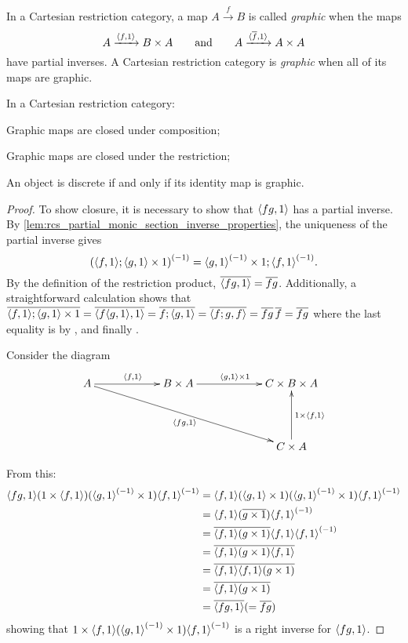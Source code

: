 In a Cartesian restriction category, a map $A\xrightarrow{f}B$ is
called \emph{graphic} when the maps
\[
A\xrightarrow{\langle f,1\rangle}B\times A\qquad \text{and}\qquad
A\xrightarrow{\langle\overline{f},1\rangle}A\times A
\]
have partial inverses.
 A Cartesian restriction category is \emph{graphic} when all of its maps
are graphic.
\begin{lemma}\label{lem:graphic_maps_are_closed_in_a_cartesian_restriction_category}
In a Cartesian restriction category:
\bproofenum
\item Graphic maps are closed under composition;
\item Graphic maps are closed under the restriction;
\item An object is discrete if and only if its identity map is graphic.
\eproofenum
\end{lemma}
\begin{proof}
\bproofenum
\item To show closure, it is necessary to show that $\langle f g,1\rangle$ has a partial inverse.
By \vref{lem:rcs_partial_monic_section_inverse_properties}, the uniqueness of the partial inverse gives
\[{(\langle f,1\rangle ; \langle g,1\rangle\times 1)}^{(-1)} = {\langle g,1\rangle}^{(-1)} \times 1 ; {\langle f,1\rangle}^{(-1)} .\]
 By the definition of the restriction product, $\overline{\langle f g,1\rangle} = \overline{f g}$. Additionally,
a straightforward calculation shows that $\overline{\langle f,1\rangle;\langle g,1\rangle \times 1} = \overline{\langle f\langle g,1\rangle, 1\rangle} = \overline{f ;\langle g,1\rangle}
= \overline{\langle f;g, f\rangle} = \overline{f g}\,\overline{f} = \overline{f g}$ where the last equality is by \rtwo, \rthree and finally \rone.

Consider the diagram
\[
\xymatrix @C+35pt @R+20pt{
A \ar[r]^{\<f,1\>} \ar[drr]_{\<f g,1\>} &
   B \times A  \ar[r]^{\<g,1\> \times 1}
   &  C \times B \times A \\
&&C \times A \ar[u]_{1 \times \<f,1\>}
}
\]

From this:
\begin{align*}
\langle f g,1\rangle  (1\times \langle f,1\rangle) ( {\langle g,1\rangle}^{(-1)}\times 1) {\langle f,1\rangle}^{(-1)}
&=\langle f,1\rangle(\langle g,1\rangle\times 1 ) ({\langle g,1\rangle}^{(-1)}\times 1) {\langle f,1\rangle}^{(-1)}\\
&=\langle f,1\rangle (\overline{g\times 1}) {\langle f,1\rangle}^{(-1)}\\
&=\overline{\langle f,1\rangle (g\times 1)}  \langle f,1\rangle {\langle f,1\rangle}^{(-1)}\\
&=\overline{\langle f,1\rangle (g\times 1)}  \overline{\langle f,1\rangle}\\
&= \overline{\langle f,1\rangle} \overline{\langle f,1\rangle(g\times 1)}\\
&= \overline{\langle f,1\rangle (g\times 1)}\\
&= \overline{\langle f g,1\rangle}(=\overline{f g})\\
\end{align*}
showing that $1\times \langle f,1\rangle  ({\langle g,1\rangle}^{(-1)}\times 1 ) {\langle f,1\rangle}^{(-1)}$ is
 a right inverse for $\langle f g,1\rangle$.


\end{proof}
